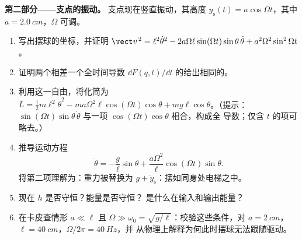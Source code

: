 \begin{problem}
\medskip\noindent\textbf{第二部分——支点的振动。}
支点现在竖直振动，其高度 $y_{\text{s}}(t) =
a\cos\Omega t$，其中 $a = \qty{2.0}{cm}$，$\Omega$ 可调。
\begin{enumerate}[resume]
  \item 写出摆球的坐标，并证明
        $\vect v^{\,2} = \ell^2\dot\theta^2 -
        2a\Omega\ell\sin(\Omega t)\sin\theta\,\dot\theta +
        a^2\Omega^2\sin^2\Omega t$。
  \item 证明两个相差一个全时间导数
        $\dd F(q,t)/\dd t$ 的给出相同的。
  \item 利用这一自由，将化简为 $L = \tfrac12 m
        \ell^2\dot\theta^2 - ma\Omega^2\ell\cos(\Omega t)\cos\theta +
        mg\ell\cos\theta$。（提示：$\sin(\Omega t)\sin\theta\,\dot\theta$
        与一项 $\cos(\Omega t)\cos\theta$ 相合，构成全
        导数；仅含 $t$ 的项可略去。）
  \item 推导运动方程
        \[
        \ddot\theta = -\frac{g}{\ell}\sin\theta
         + \frac{a\Omega^2}{\ell}\cos(\Omega t)\sin\theta .
        \]
        将第二项理解为：重力被替换为 $g +
        \ddot y_{\text{s}}$：摆如同身处电梯之中。
  \item 现在 $h$ 是否守恒？能量是否守恒？
        是什么在输入和输出能量？
  \item 在卡皮查情形 $a \ll \ell$ 且 $\Omega \gg \omega_0 =
        \sqrt{g/\ell}$：校验这些条件，对 $a = \qty{2}{cm}$，$\ell =
        \qty{40}{cm}$，$\Omega/2\pi = \qty{40}{Hz}$，并
        从物理上解释为何此时摆球无法跟随驱动。
\end{enumerate}


\end{problem}
